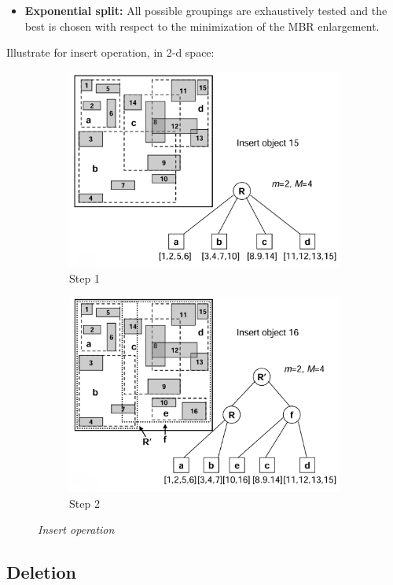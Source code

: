 \documentclass{article}
\begin{document}
\begin{itemize}
    \item \textbf{Exponential split:} All possible groupings are exhaustively tested and the best is chosen with respect to the minimization of the MBR enlargement.
\end{itemize}

\clearpage

Illustrate for insert operation, in 2-d space:

\begin{figure}[h]
    \centering
        \begin{subfigure}{0.3\textwidth}
        \includegraphics[width=\textwidth]{insert1 (1).png}
        \caption{Step 1}
        \centering
        \end{subfigure}
        \begin{subfigure}{0.3\textwidth}
        \includegraphics[width=\textwidth]{insert1 (2).png}
        \caption{Step 2}
        \centering
        \end{subfigure}
    \caption{\textit{Insert operation}}
\end{figure}

\subsection{Deletion}
\end{document}
